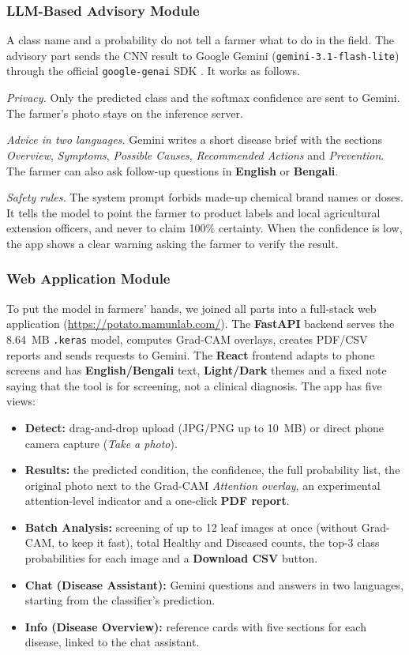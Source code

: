 \subsubsection{LLM-Based Advisory Module}
A class name and a probability do not tell a farmer what to do in the field. The advisory part sends the CNN result to Google Gemini (\texttt{gemini-3.1-flash-lite}) through the official \texttt{google-genai} SDK \cite{google2026gemini}. It works as follows.

\textit{Privacy.} Only the predicted class and the softmax confidence are sent to Gemini. The farmer's photo stays on the inference server.

\textit{Advice in two languages.} Gemini writes a short disease brief with the sections \textit{Overview}, \textit{Symptoms}, \textit{Possible Causes}, \textit{Recommended Actions} and \textit{Prevention}. The farmer can also ask follow-up questions in \textbf{English} or \textbf{Bengali}.

\textit{Safety rules.} The system prompt forbids made-up chemical brand names or doses. It tells the model to point the farmer to product labels and local agricultural extension officers, and never to claim 100\% certainty. When the confidence is low, the app shows a clear warning asking the farmer to verify the result.

\subsubsection{Web Application Module}
To put the model in farmers' hands, we joined all parts into a full-stack web application (\url{https://potato.mamunlab.com/}). The \textbf{FastAPI} backend serves the 8.64~MB \texttt{.keras} model, computes Grad-CAM overlays, creates PDF/CSV reports and sends requests to Gemini. The \textbf{React} frontend adapts to phone screens and has \textbf{English/Bengali} text, \textbf{Light/Dark} themes and a fixed note saying that the tool is for screening, not a clinical diagnosis. The app has five views:
\begin{itemize}
    \item \textbf{Detect:} drag-and-drop upload (JPG/PNG up to 10~MB) or direct phone camera capture (\textit{Take a photo}).
    \item \textbf{Results:} the predicted condition, the confidence, the full probability list, the original photo next to the Grad-CAM \textit{Attention overlay}, an experimental attention-level indicator and a one-click \textbf{PDF report}.
    \item \textbf{Batch Analysis:} screening of up to 12 leaf images at once (without Grad-CAM, to keep it fast), total Healthy and Diseased counts, the top-3 class probabilities for each image and a \textbf{Download CSV} button.
    \item \textbf{Chat (Disease Assistant):} Gemini questions and answers in two languages, starting from the classifier's prediction.
    \item \textbf{Info (Disease Overview):} reference cards with five sections for each disease, linked to the chat assistant.
\end{itemize}

\clearpage
